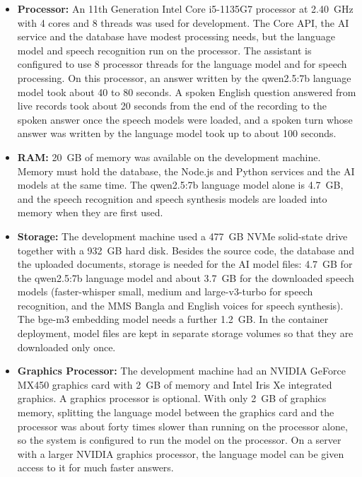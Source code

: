 \begin{itemize}
    \item \textbf{Processor:}
    An 11th Generation Intel Core i5-1135G7 processor at 2.40~GHz with 4 cores and 8 threads was used for development. The Core API, the AI service and the database have modest processing needs, but the language model and speech recognition run on the processor. The assistant is configured to use 8 processor threads for the language model and for speech processing. On this processor, an answer written by the qwen2.5:7b language model took about 40 to 80 seconds. A spoken English question answered from live records took about 20 seconds from the end of the recording to the spoken answer once the speech models were loaded, and a spoken turn whose answer was written by the language model took up to about 100 seconds.

    \item \textbf{RAM:}
    20~GB of memory was available on the development machine. Memory must hold the database, the Node.js and Python services and the AI models at the same time. The qwen2.5:7b language model alone is 4.7~GB, and the speech recognition and speech synthesis models are loaded into memory when they are first used.

    \item \textbf{Storage:}
    The development machine used a 477~GB NVMe solid-state drive together with a 932~GB hard disk. Besides the source code, the database and the uploaded documents, storage is needed for the AI model files: 4.7~GB for the qwen2.5:7b language model and about 3.7~GB for the downloaded speech models (faster-whisper small, medium and large-v3-turbo for speech recognition, and the MMS Bangla and English voices for speech synthesis). The bge-m3 embedding model needs a further 1.2~GB. In the container deployment, model files are kept in separate storage volumes so that they are downloaded only once.

    \item \textbf{Graphics Processor:}
    The development machine had an NVIDIA GeForce MX450 graphics card with 2~GB of memory and Intel Iris Xe integrated graphics. A graphics processor is optional. With only 2~GB of graphics memory, splitting the language model between the graphics card and the processor was about forty times slower than running on the processor alone, so the system is configured to run the model on the processor. On a server with a larger NVIDIA graphics processor, the language model can be given access to it for much faster answers.


\end{itemize}
